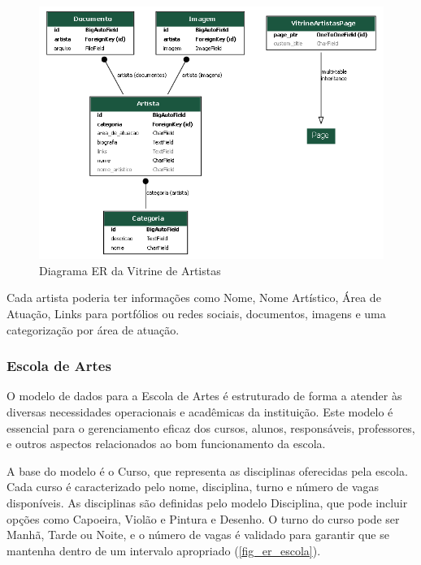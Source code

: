 \begin{figure}[htb]
	\caption{\label{fig_er_vitrine}Diagrama ER da Vitrine de Artistas}
	\begin{center}
	    \includegraphics[scale=0.5]{./img/er_diagram_vitrine.png}
	\end{center}
\end{figure}

Cada artista poderia ter informações como Nome, Nome Artístico, Área de Atuação, Links para portfólios ou redes sociais, documentos, imagens e uma categorização por área de atuação.



\subsubsection{Escola de Artes}

O modelo de dados para a Escola de Artes é estruturado de forma a atender às diversas necessidades operacionais e acadêmicas da instituição. Este modelo é essencial para o gerenciamento eficaz dos cursos, alunos, responsáveis, professores, e outros aspectos relacionados ao bom funcionamento da escola.

A base do modelo é o Curso, que representa as disciplinas oferecidas pela escola. Cada curso é caracterizado pelo nome, disciplina, turno e número de vagas disponíveis. As disciplinas são definidas pelo modelo Disciplina, que pode incluir opções como Capoeira, Violão e Pintura e Desenho. O turno do curso pode ser Manhã, Tarde ou Noite, e o número de vagas é validado para garantir que se mantenha dentro de um intervalo apropriado (\autoref{fig_er_escola}).


